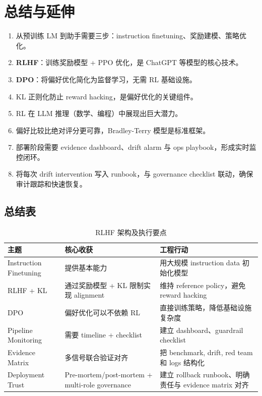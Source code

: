 \section{总结与延伸}

\begin{enumerate}
    \item 从预训练 LM 到助手需要三步：instruction finetuning、奖励建模、策略优化。
    \item \textbf{RLHF}：训练奖励模型 + PPO 优化，是 ChatGPT 等模型的核心技术。
    \item \textbf{DPO}：将偏好优化简化为监督学习，无需 RL 基础设施。
    \item KL 正则化防止 reward hacking，是偏好优化的关键组件。
    \item RL 在 LLM 推理（数学、编程）中展现出巨大潜力。
    \item 偏好比较比绝对评分更可靠，Bradley-Terry 模型是标准框架。
    \item 部署阶段需要 evidence dashboard、drift alarm 与 ops playbook，形成实时监控闭环。
    \item 将每次 drift intervention 写入 runbook，与 governance checklist 联动，确保审计跟踪和快速恢复。
\end{enumerate}

\subsection{总结表}

\begin{table}[H]
\centering
\begin{tabular}{p{} p{} p{}}
\toprule
主题 & 核心收获 & 工程行动 \\
\midrule
Instruction Finetuning & 提供基本能力 & 用大规模 instruction data 初始化模型 \\
RLHF + KL & 通过奖励模型 + KL 限制实现 alignment & 维持 reference policy，避免 reward hacking \\
DPO & 偏好优化可以不依赖 RL & 直接训练策略，降低基础设施复杂度 \\
Pipeline Monitoring & 需要 timeline + checklist & 建立 dashboard、guardrail checklist \\
Evidence Matrix & 多信号联合验证对齐 & 把 benchmark, drift, red team 和 logs 结构化 \\
Deployment Trust & Pre-mortem/post-mortem + multi-role governance & 建立 rollback runbook、明确责任与 evidence matrix 对齐 \\
\bottomrule
\end{tabular}
\caption{RLHF 架构及执行要点}
\end{table}

